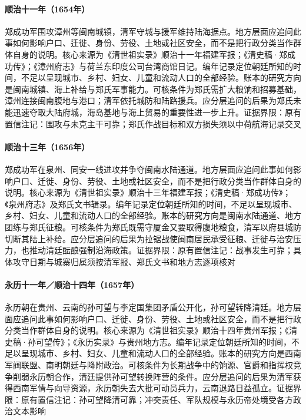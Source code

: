 \hypertarget{social:EQ-1654-ZHENG-ZHANGZHOU}{}\paragraph{顺治十一年（1654年）}郑成功军围攻漳州等闽南城镇，清军守城与援军维持陆海据点。地方层面应追问此事如何影响户口、迁徙、身份、劳役、土地或社区安全，而不是把行政分类当作群体自身的说明。核心来源为《清世祖实录》顺治十一年福建军报；《清史稿·郑成功传》；《漳州府志》与荷兰东印度公司台湾商馆日记。编年记录定位朝廷所知的时间，不足以呈现城市、乡村、妇女、儿童和流动人口的全部经验。账本的研究方向是闽南城镇、海上补给与郑氏军事能力。可核条件为郑氏需扩大粮饷和招募基础，漳州连接闽南腹地与港口；清军依托城防和陆路援兵。应分层追问的后果为郑氏未能迅速夺取大陆府城，海岛基地与海上贸易的重要性进一步上升。证据界限：原有置信注记：围攻与未克主干可靠；郑氏作战目标和双方损失须以中荷航海记录交叉
\hypertarget{social:EQ-1656-ZHENG-QUANZHOU}{}\paragraph{顺治十三年（1656年）}郑成功军在泉州、同安一线进攻并争夺闽南水陆通道。地方层面应追问此事如何影响户口、迁徙、身份、劳役、土地或社区安全，而不是把行政分类当作群体自身的说明。核心来源为《清世祖实录》顺治十三年福建军报；《清史稿·郑成功传》；《泉州府志》及郑氏文书辑录。编年记录定位朝廷所知的时间，不足以呈现城市、乡村、妇女、儿童和流动人口的全部经验。账本的研究方向是闽南水陆通道、地方团练与郑氏征粮。可核条件为郑氏既需守厦金又要取得腹地粮食，清军以府县城防切断其陆上补给。应分层追问的后果为拉锯战使闽南居民承受征粮、迁徙与治安压力，也推动清廷酝酿强制沿海政策。证据界限：原有置信注记：战事发生可靠；具体攻守日期与城寨归属须按清军报、郑氏文书和地方志逐项核对
\hypertarget{social:EQ-1657-YONGLI-GUIZHOU}{}\paragraph{永历十一年／顺治十四年（1657年）}永历朝在贵州、云南的孙可望与李定国集团矛盾公开化，孙可望转降清廷。地方层面应追问此事如何影响户口、迁徙、身份、劳役、土地或社区安全，而不是把行政分类当作群体自身的说明。核心来源为《清世祖实录》顺治十四年贵州军报；《清史稿·孙可望传》；《永历实录》与贵州地方志。编年记录定位朝廷所知的时间，不足以呈现城市、乡村、妇女、儿童和流动人口的全部经验。账本的研究方向是西南军阀联盟、南明朝廷与降附政治。可核条件为长期战争中的饷源、官爵和指挥权竞争削弱永历朝合作，清廷提供孙可望转换阵营的条件。应分层追问的后果为清军获得西南军情与向导资源，永历朝失去大批可动员兵力，云南退路日益孤立。证据界限：原有置信注记：孙可望降清可靠；冲突责任、军队规模与永历帝处境受各方政治文本影响
